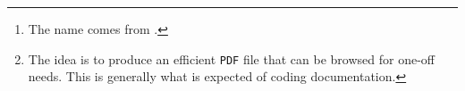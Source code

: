 \begin{abstract}
    The \thisproj{} class\,%
    \footnote{
        The name comes from .
    }
    is used by its author to semantically produce documentation of \LaTeX\ packages and classes in a tutorial style\,%
    \footnote{
        The idea is to produce an efficient \texttt{PDF} file that can be browsed for one-off needs. This is generally what is expected of coding documentation.
    }
    using a sober rendering for reading on screen.

    \smallskip

    \noindent
    \emph{\textbf{Remark :} this documentation is also available in French.}
\end{abstract}

\tdocsep


